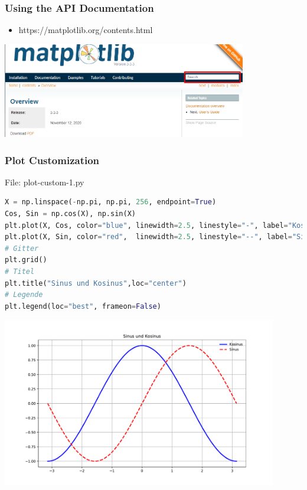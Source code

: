 \begin{frame}[fragile]
	\frametitle{Using the API Documentation}
    \begin{itemize}
      \item https://matplotlib.org/contents.html
    \end{itemize}			
   \vspace{2cm}			
    \begin{center}
      \includegraphics[width=0.8\textwidth]{screenshots/manual-api.png}
    \end{center}						
\end{frame}

\begin{frame}[fragile]
	\frametitle{Plot Customization}
    \begin{block}{File: plot-custom-1.py}
    \begin{lstlisting}[language=Python]
X = np.linspace(-np.pi, np.pi, 256, endpoint=True)
Cos, Sin = np.cos(X), np.sin(X)
plt.plot(X, Cos, color="blue", linewidth=2.5, linestyle="-", label="Kosinus")
plt.plot(X, Sin, color="red",  linewidth=2.5, linestyle="--", label="Sinus")
# Gitter 
plt.grid()
# Titel
plt.title("Sinus und Kosinus",loc="center")
# Legende
plt.legend(loc="best", frameon=False)
    \end{lstlisting}      
		\end{block}
\end{frame}

\begin{frame}[fragile]
   \vspace{-1cm}
    \begin{center}
      \includegraphics[width=0.9\textwidth]{screenshots/plt-4.pdf}
    \end{center}						
\end{frame}


